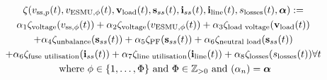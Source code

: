 \begin{multline}
	\zeta(v_{\text{ss},p}(t), v_{\text{ESMU},\phi}(t), \textbf{v}_{\text{load}}(t), \textbf{s}_{ss}(t), \textbf{i}_{ss}(t), \textbf{i}_{\text{line}}(t), s_\text{losses}(t), \boldsymbol{\alpha}) :=\\
	\alpha_1 \zeta_\text{voltage}(v_{\text{ss},\phi}(t))%
	+ \alpha_2 \zeta_\text{voltage}(v_{\text{ESMU},\phi}(t))%
	+ \alpha_3 \zeta_\text{\text{load} voltage}(\textbf{v}_{\text{load}}(t))\\
	+ \alpha_4 \zeta_\text{unbalance}(\textbf{s}_{ss}(t))%
	+ \alpha_5 \zeta_\text{PF}(\textbf{s}_{ss}(t))%
	+ \alpha_6 \zeta_{\text{neutral load}}(\textbf{s}_{ss}(t))\\
	+ \alpha_6 \zeta_\text{fuse utilisation}(\textbf{i}_{ss}(t))%
	+ \alpha_7 \zeta_\text{\text{line} utilisation}(\textbf{i}_{\text{line}}(t))%
	+ \alpha_8 \zeta_\text{losses}(s_\text{losses}(t))%
	 \forall t \\
	 \text{ where } \phi \in \{1, \dots, \Phi\} \text{ and } \Phi \in \mathbb{Z}_{>0} \text{ and } (\alpha_n) = \boldsymbol{\alpha}
\label{ch1:equ:weighted-sum-cost-function}
\end{multline}
